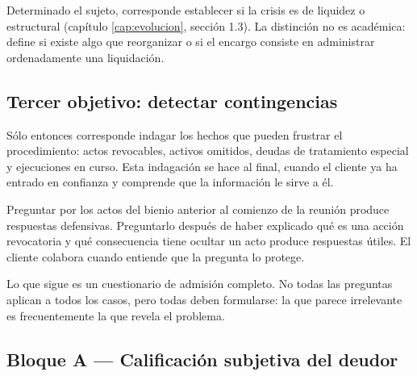 Determinado el sujeto, corresponde establecer si la crisis es de liquidez o estructural
(capítulo \ref{cap:evolucion}, sección 1.3). La distinción no es académica: define si
existe algo que reorganizar o si el encargo consiste en administrar ordenadamente una
liquidación.

\subsection{Tercer objetivo: detectar contingencias}

Sólo entonces corresponde indagar los hechos que pueden frustrar el procedimiento:
actos revocables, activos omitidos, deudas de tratamiento especial y ejecuciones en
curso. Esta indagación se hace al final, cuando el cliente ya ha entrado en confianza y
comprende que la información le sirve a él.

\begin{practica}
Preguntar por los actos del bienio anterior al comienzo de la reunión produce respuestas
defensivas. Preguntarlo después de haber explicado qué es una acción revocatoria y qué
consecuencia tiene ocultar un acto produce respuestas útiles. El cliente colabora cuando
entiende que la pregunta lo protege.
\end{practica}

\bloqueEntrevista

Lo que sigue es un cuestionario de admisión completo. No todas las preguntas aplican a
todos los casos, pero todas deben formularse: la que parece irrelevante es
frecuentemente la que revela el problema.

\subsection{Bloque A — Calificación subjetiva del deudor}

